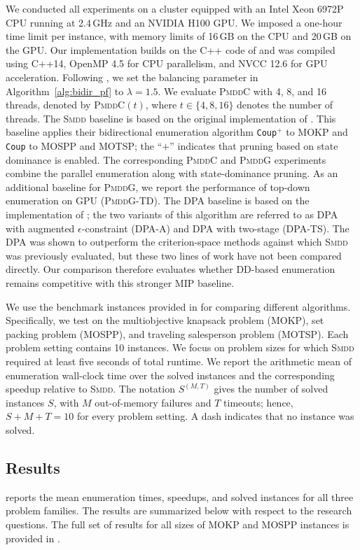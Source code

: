\documentclass[letterpaper]{article}
\begin{document}
We conducted all experiments on a cluster equipped with an Intel Xeon 6972P CPU running at 2.4\,GHz and an NVIDIA H100 GPU. We imposed a one-hour time limit per instance, with memory limits of 16\,GB on the CPU and 20\,GB on the GPU. Our implementation builds on the C++ code of \citet{bergman2022network} and was compiled using C++14, OpenMP 4.5 for CPU parallelism, and NVCC 12.6 for GPU acceleration. Following \citet{bergman2022network}, we set the balancing parameter in Algorithm~\ref{alg:bidir_pf} to $\lambda=1.5$. We evaluate \textsc{PmddC} with 4, 8, and 16 threads, denoted by \textsc{PmddC}$(t)$, where $t \in \{4,8,16\}$ denotes the number of threads. The \textsc{Smdd} baseline is based on the original implementation of \citet{bergman2022network}. This baseline applies their bidirectional enumeration algorithm \texttt{Coup}$^+$ to MOKP and \texttt{Coup} to MOSPP and MOTSP; the ``$+$'' indicates that pruning based on state dominance is enabled. The corresponding \textsc{PmddC} and \textsc{PmddG} experiments combine the parallel enumeration along with state-dominance pruning. As an additional baseline for \textsc{PmddG},  we report the performance of top-down enumeration on GPU (\textsc{PmddG-TD}). The DPA baseline is based on the implementation of \citet{dachert2024simple}; the two variants of this algorithm are referred to as DPA with augmented $\epsilon$-constraint (DPA-A) and DPA with two-stage (DPA-TS). The DPA was shown to outperform the criterion-space methods against which \textsc{Smdd} was previously evaluated, but these two lines of work have not been compared directly. Our comparison therefore evaluates whether DD-based enumeration remains competitive with this stronger MIP baseline.

We use the benchmark instances provided in \citet{bergman2022network} for comparing different algorithms. Specifically, we test on the multiobjective knapsack problem (MOKP), set packing problem (MOSPP), and traveling salesperson problem (MOTSP). Each problem setting contains 10 instances. We focus on problem sizes for which \textsc{Smdd} required at least five seconds of total runtime. We report the arithmetic mean of enumeration wall-clock time over the solved instances and the corresponding speedup relative to \textsc{Smdd}. The notation $S^{(M,T)}$ gives the number of solved instances $S$, with $M$ out-of-memory failures and $T$ timeouts; hence, $S+M+T=10$ for every problem setting. A dash indicates that no instance was solved.

\subsection{Results}
 reports the mean enumeration times, speedups, and solved instances for all three problem families. The results are summarized below with respect to the research questions. The full set of results for all sizes of MOKP and MOSPP instances is provided in .
\end{document}
